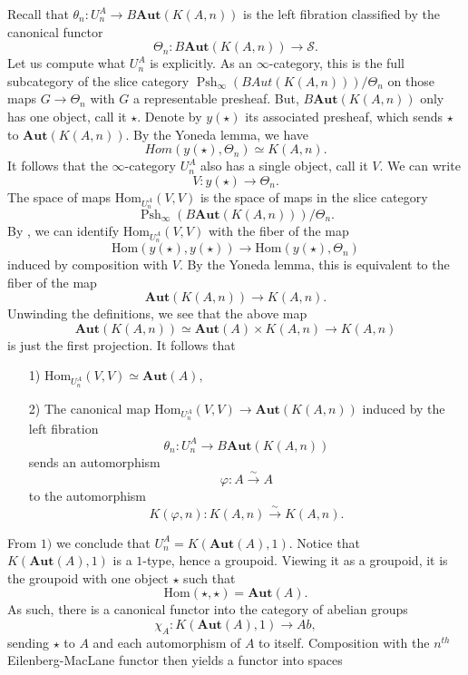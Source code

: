 \documentclass[12pt]{amsart}
\theoremstyle{definition}
\newcommand{\cS}{\mathcal{S}}
\newcommand{\Hom}{\mathrm{Hom}}
\renewcommand{\i}{\infty}
\DeclareMathOperator{\Psh}{Psh}
\def\Pshi{\operatorname{Psh}_\i}
\def\Aut{\mathbf{Aut}}
\begin{document}
Recall that $\theta_n:U_n^A \to B\Aut\left(K\left(A,n\right)\right)$ is the left fibration classified by the canonical functor $$\Theta_n:B\Aut\left(K\left(A,n\right)\right) \to \cS.$$ Let us compute what $U_n^A$ is explicitly. As an $\i$-category, this is the full subcategory of the slice category $\Pshi\left(BAut\left(K\left(A,n\right)\right)\right)/\Theta_n$ on those maps $G \to \Theta_n$ with $G$ a representable presheaf. But, $B \Aut\left(K\left(A,n\right)\right)$ only has one object, call it $\star$. Denote by $y\left(\star\right)$ its associated presheaf, which sends $\star$ to $\Aut\left(K\left(A,n\right)\right)$. By the Yoneda lemma, we have $$Hom\left(y\left(\star\right),\Theta_n\right)\simeq K\left(A,n\right).$$ It follows that the $\i$-category $U_n^A$ also has a single object, call it  $V$. We can write $$V:y\left(\star\right) \to \Theta_n.$$ The space of maps $\Hom_{U_n^A}\left(V,V\right)$ is the space of maps in the slice category $$\Psh_\infty\left(B\Aut\left(K\left(A,n\right)\right)\right)/\Theta_n.$$ By \cite[Proposition 5.5.5.12]{htt}, we can identify $\Hom_{U_n^A}\left(V,V\right)$ with the fiber of the map
$$\Hom\left(y\left(\star\right),y\left(\star\right)\right) \to \Hom\left(y\left(\star\right),\Theta_n\right)$$ induced by composition with $V.$ By the Yoneda lemma, this is equivalent to the fiber of the map 
$$\Aut\left(K\left(A,n\right)\right) \to K\left(A,n\right).$$ Unwinding the definitions, we see that the above map $$\Aut\left(K\left(A,n\right)\right)\simeq \Aut\left(A\right) \times K\left(A,n\right) \to K\left(A,n\right)$$ is just the first projection. It follows that
\begin{itemize}
\item[1)] $\Hom_{U_n^A}\left(V,V\right) \simeq \Aut\left(A\right),$
\item[2)] The canonical map $\Hom_{U_n^A}\left(V,V\right) \to \Aut\left(K\left(A,n\right)\right)$ induced by the left fibration $$\theta_n:U_n^A \to B \Aut\left(K\left(A,n\right)\right)$$ sends an automorphism $$\varphi:A \stackrel{\sim}{\longrightarrow} A$$ to the automorphism $$K\left(\varphi,n\right):K\left(A,n\right) \stackrel{\sim}{\longrightarrow} K\left(A,n\right).$$
\end{itemize}
From $1)$ we conclude that $U_n^A=K\left(\Aut\left(A\right),1\right).$ Notice that $K\left(\Aut\left(A\right),1\right)$ is a $1$-type, hence a groupoid. Viewing it as a groupoid, it is the groupoid with one object $\star$ such that $$\Hom\left(\star,\star\right)=\Aut\left(A\right).$$ As such, there is a canonical functor into the category of abelian groups $$\chi_A:K\left(\Aut\left(A\right),1\right) \to Ab,$$ sending $\star$ to $A$ and each automorphism of $A$ to itself. Composition with the $n^{th}$ Eilenberg-MacLane functor then yields a functor into spaces 
\end{document}

